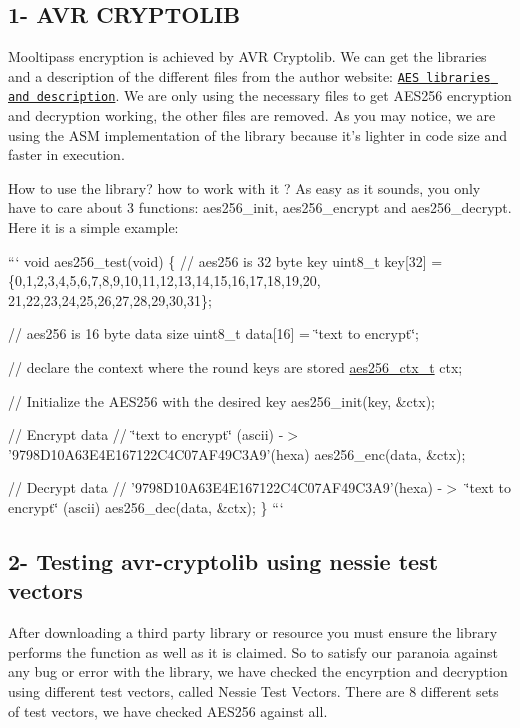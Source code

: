 \subsection*{1-\/ A\+V\+R C\+R\+Y\+P\+T\+O\+L\+I\+B }

Mooltipass encryption is achieved by A\+V\+R Cryptolib. We can get the libraries and a description of the different files from the author website\+: \href{http://avrcryptolib.das-labor.org/trac/wiki/AES}{\tt A\+E\+S libraries and description}. We are only using the necessary files to get A\+E\+S256 encryption and decryption working, the other files are removed. As you may notice, we are using the A\+S\+M implementation of the library because it's lighter in code size and faster in execution.

How to use the library? how to work with it ? As easy as it sounds, you only have to care about 3 functions\+: aes256\+\_\+init, aes256\+\_\+encrypt and aes256\+\_\+decrypt. Here it is a simple example\+:

``` void aes256\+\_\+test(void) \{ // aes256 is 32 byte key uint8\+\_\+t key\mbox{[}32\mbox{]} = \{0,1,2,3,4,5,6,7,8,9,10,11,12,13,14,15,16,17,18,19,20, 21,22,23,24,25,26,27,28,29,30,31\};

// aes256 is 16 byte data size uint8\+\_\+t data\mbox{[}16\mbox{]} = \char`\"{}text to encrypt\char`\"{};

// declare the context where the round keys are stored \hyperlink{structaes256__ctx__t}{aes256\+\_\+ctx\+\_\+t} ctx;

// Initialize the A\+E\+S256 with the desired key aes256\+\_\+init(key, \&ctx);

// Encrypt data // \char`\"{}text to encrypt\char`\"{} (ascii) -\/$>$ '9798\+D10\+A63\+E4\+E167122\+C4\+C07\+A\+F49\+C3\+A9'(hexa) aes256\+\_\+enc(data, \&ctx);

// Decrypt data // '9798\+D10\+A63\+E4\+E167122\+C4\+C07\+A\+F49\+C3\+A9'(hexa) -\/$>$ \char`\"{}text to encrypt\char`\"{} (ascii) aes256\+\_\+dec(data, \&ctx); \} ```

\subsection*{2-\/ Testing avr-\/cryptolib using nessie test vectors }

After downloading a third party library or resource you must ensure the library performs the function as well as it is claimed. So to satisfy our paranoia against any bug or error with the library, we have checked the encyrption and decryption using different test vectors, called Nessie Test Vectors. There are 8 different sets of test vectors, we have checked A\+E\+S256 against all.

